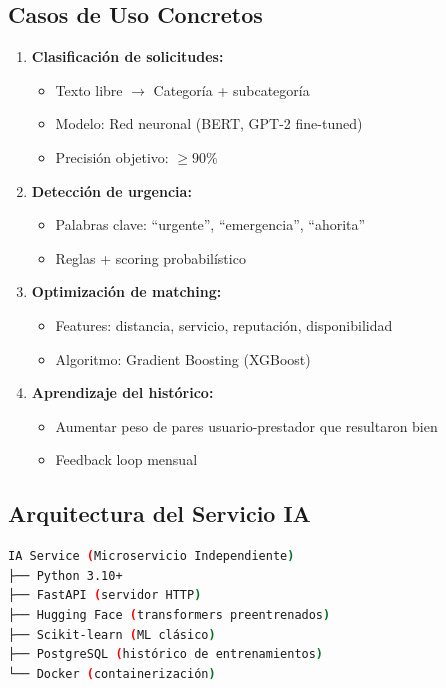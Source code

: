 \documentclass[12pt,a4paper,spanish]{article}
\begin{document}
\subsection{Casos de Uso Concretos}

\begin{enumerate}
    \item \textbf{Clasificación de solicitudes:}
    \begin{itemize}
        \item Texto libre $\rightarrow$ Categoría + subcategoría
        \item Modelo: Red neuronal (BERT, GPT-2 fine-tuned)
        \item Precisión objetivo: $\geq 90\%$
    \end{itemize}

    \item \textbf{Detección de urgencia:}
    \begin{itemize}
        \item Palabras clave: ``urgente'', ``emergencia'', ``ahorita''
        \item Reglas + scoring probabilístico
    \end{itemize}

    \item \textbf{Optimización de matching:}
    \begin{itemize}
        \item Features: distancia, servicio, reputación, disponibilidad
        \item Algoritmo: Gradient Boosting (XGBoost)
    \end{itemize}

    \item \textbf{Aprendizaje del histórico:}
    \begin{itemize}
        \item Aumentar peso de pares usuario-prestador que resultaron bien
        \item Feedback loop mensual
    \end{itemize}
\end{enumerate}

\subsection{Arquitectura del Servicio IA}

\begin{lstlisting}[language=bash]
IA Service (Microservicio Independiente)
├── Python 3.10+
├── FastAPI (servidor HTTP)
├── Hugging Face (transformers preentrenados)
├── Scikit-learn (ML clásico)
├── PostgreSQL (histórico de entrenamientos)
└── Docker (containerización)
\end{lstlisting}
\end{document}
